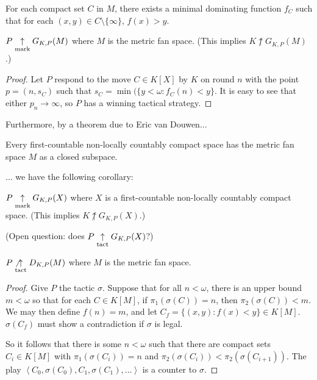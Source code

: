 \begin{prop}
For each compact set $C$ in $M$, there exists a minimal dominating function $f_C$ such that for each $(x,y)\in C\setminus\{\infty\}$, $f(x)> y$.
\end{prop}

\begin{lem}
$P \underset{\text{mark}}{\uparrow} G_{K,P}(M)$ where $M$ is the metric fan space. (This implies $K\not\uparrow G_{K,P}(M)$.)
\end{lem}

\begin{proof}
Let $P$ respond to the move $C\in K[X]$ by $K$ on round $n$ with the point $p=(n,s_C)$ such that $s_C = \min(\{y<\omega : f_C(n) < y\}$. It is easy to see that either $p_n\rightarrow \infty$, so $P$ has a winning tactical strategy.
\end{proof}

Furthermore, by a theorem due to Eric van Douwen...

\begin{thm}
Every first-countable non-locally countably compact space has the metric fan space $M$ as a closed subspace.
\end{thm}

... we have the following corollary:

\begin{cor}
$P \underset{\text{mark}}{\uparrow} G_{K,P}(X)$ where $X$ is a first-countable non-locally countably compact space. (This implies $K\not\uparrow G_{K,P}(X)$.)
\end{cor}

(Open question: does $P \underset{\text{tact}}{\uparrow} G_{K,P}(X)$?)

\begin{thm}
$P \not\underset{\text{tact}}{\uparrow} D_{K,P}(M)$ where $M$ is the metric fan space.
\end{thm}

\begin{proof}
Give $P$ the tactic $\sigma$. Suppose that for all $n<\omega$, there is an upper bound $m<\omega$ so that for each $C \in K[M]$, if $\pi_1(\sigma(C))=n$, then $\pi_2(\sigma(C))<m$. We may then define $f(n)=m$, and let $C_f=\{(x,y):f(x)<y\}\in K[M]$. $\sigma(C_f)$ must show a contradiction if $\sigma$ is legal.

So it follows that there is some $n<\omega$ such that there are compact sets $C_i\in K[M]$ with $\pi_1(\sigma(C_i))=n$ and $\pi_2(\sigma(C_i))<\pi_2(\sigma(C_{i+1}))$. The play $\left<C_0,\sigma(C_0),C_1,\sigma(C_1),\dots\right>$ is a counter to $\sigma$.
\end{proof}

